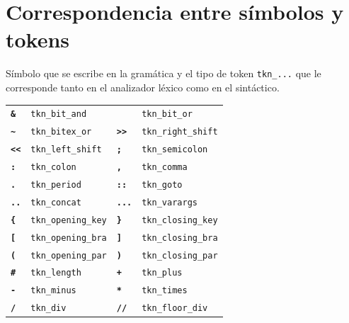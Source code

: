 \documentclass[11pt,a4paper]{article}
\newcommand{\tk}[1]{\textbf{\texttt{#1}}}
\begin{document}
\section{Correspondencia entre símbolos y tokens}
Símbolo que se escribe en la gramática y el tipo de token \texttt{tkn\_...} que le corresponde tanto en el analizador léxico como en el sintáctico.

\begin{longtable}{@{}l@{\quad}l@{\qquad}l@{\quad}l@{}}
\tk{\textquotesingle{}\&\textquotesingle{}} & \texttt{tkn\_bit\_and} & \tk{\textquotesingle{}\textbar{}\textquotesingle{}} & \texttt{tkn\_bit\_or} \\
\tk{\textquotesingle{}\textasciitilde{}\textquotesingle{}} & \texttt{tkn\_bitex\_or} & \tk{\textquotesingle{}>{}>\textquotesingle{}} & \texttt{tkn\_right\_shift} \\
\tk{\textquotesingle{}<{}<\textquotesingle{}} & \texttt{tkn\_left\_shift} & \tk{\textquotesingle{};\textquotesingle{}} & \texttt{tkn\_semicolon} \\
\tk{\textquotesingle{}:\textquotesingle{}} & \texttt{tkn\_colon} & \tk{\textquotesingle{},\textquotesingle{}} & \texttt{tkn\_comma} \\
\tk{\textquotesingle{}.\textquotesingle{}} & \texttt{tkn\_period} & \tk{\textquotesingle{}::\textquotesingle{}} & \texttt{tkn\_goto} \\
\tk{\textquotesingle{}..\textquotesingle{}} & \texttt{tkn\_concat} & \tk{\textquotesingle{}...\textquotesingle{}} & \texttt{tkn\_varargs} \\
\tk{\textquotesingle{}\{\textquotesingle{}} & \texttt{tkn\_opening\_key} & \tk{\textquotesingle{}\}\textquotesingle{}} & \texttt{tkn\_closing\_key} \\
\tk{\textquotesingle{}[\textquotesingle{}} & \texttt{tkn\_opening\_bra} & \tk{\textquotesingle{}]\textquotesingle{}} & \texttt{tkn\_closing\_bra} \\
\tk{\textquotesingle{}(\textquotesingle{}} & \texttt{tkn\_opening\_par} & \tk{\textquotesingle{})\textquotesingle{}} & \texttt{tkn\_closing\_par} \\
\tk{\textquotesingle{}\#\textquotesingle{}} & \texttt{tkn\_length} & \tk{\textquotesingle{}+\textquotesingle{}} & \texttt{tkn\_plus} \\
\tk{\textquotesingle{}-\textquotesingle{}} & \texttt{tkn\_minus} & \tk{\textquotesingle{}*\textquotesingle{}} & \texttt{tkn\_times} \\
\tk{\textquotesingle{}/\textquotesingle{}} & \texttt{tkn\_div} & \tk{\textquotesingle{}//\textquotesingle{}} & \texttt{tkn\_floor\_div} \\

\end{longtable}
\end{document}
